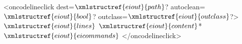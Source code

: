 <oncodelineclick dest=$\xmlstructref{eiout}{path}$? autoclean=$\xmlstructref{eiout}{bool}$? outclass=$\xmlstructref{eiout}{outclass}$?>
  $\xmlstructref{eiout}{lines}$
  $\xmlstructref{eiout}{content}$*
  $\xmlstructref{eiout}{eicommands}$
</oncodelineclick>

